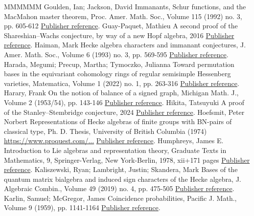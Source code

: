 \begin{thebibliography}{MMMMMM}
 Goulden, Ian; Jackson, David Immanants, Schur functions, and the MacMahon master theorem, Proc. Amer. Math. Soc., Volume 115 (1992) no. 3, pp. 605-612 \href{https://alco.centre-mersenne.org/articles/10.5802/alco.459/#GJMaster}{Publisher reference}.
 Guay-Paquet, Mathieu A second proof of the Shareshian–Wachs conjecture, by way of a new Hopf algebra, 2016 \href{https://alco.centre-mersenne.org/articles/10.5802/alco.459/#GPSecondPf}{Publisher reference}.
 Haiman, Mark Hecke algebra characters and immanant conjectures, J. Amer. Math. Soc., Volume 6 (1993) no. 3, pp. 569-595 \href{https://alco.centre-mersenne.org/articles/10.5802/alco.459/#HaimanHecke}{Publisher reference}.
 Harada, Megumi; Precup, Martha; Tymoczko, Julianna Toward permutation bases in the equivariant cohomology rings of regular semisimple Hessenberg varieties, Matematica, Volume 1 (2022) no. 1, pp. 263-316 \href{https://alco.centre-mersenne.org/articles/10.5802/alco.459/#HPTPermutationBases}{Publisher reference}.
 Harary, Frank On the notion of balance of a signed graph, Michigan Math. J., Volume 2 (1953/54), pp. 143-146 \href{https://alco.centre-mersenne.org/articles/10.5802/alco.459/#HararyNBSG}{Publisher reference}.
 Hikita, Tatsuyuki A proof of the Stanley–Stembridge conjecture, 2024 \href{https://alco.centre-mersenne.org/articles/10.5802/alco.459/#HikitaProof}{Publisher reference}.
 Hoefsmit, Peter Norbert Representations of Hecke algebras of finite groups with BN-pairs of classical type, Ph. D. Thesis, University of British Columbia (1974) \url{https://www.proquest.com/...} \href{https://alco.centre-mersenne.org/articles/10.5802/alco.459/#HoefsmitThesis}{Publisher reference}.
 Humphreys, James E. Introduction to Lie algebras and representation theory, Graduate Texts in Mathematics, 9, Springer-Verlag, New York-Berlin, 1978, xii+171 pages \href{https://alco.centre-mersenne.org/articles/10.5802/alco.459/#Hum2}{Publisher reference}.
 Kaliszewski, Ryan; Lambright, Justin; Skandera, Mark Bases of the quantum matrix bialgebra and induced sign characters of the Hecke algebra, J. Algebraic Combin., Volume 49 (2019) no. 4, pp. 475-505 \href{https://alco.centre-mersenne.org/articles/10.5802/alco.459/#KLSBasesQMBIndSgn}{Publisher reference}.
 Karlin, Samuel; McGregor, James Coincidence probabilities, Pacific J. Math., Volume 9 (1959), pp. 1141-1164 \href{https://alco.centre-mersenne.org/articles/10.5802/alco.459/#KMG}{Publisher reference}.

\end{thebibliography}
